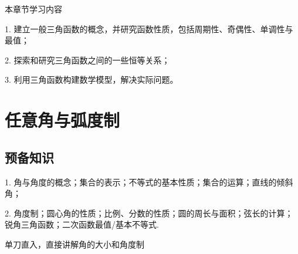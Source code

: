\makefront
\vspace{-1.5em}
\startexercise
\hspace{-2.5em}
{\hei 本章节学习内容}\par
1. 建立一般三角函数的概念，并研究函数性质，包括周期性、奇偶性、单调性与最值；\par
2. 探索和研究三角函数之间的一些恒等关系；\par
3. 利用三角函数构建数学模型，解决实际问题。\par

\section{任意角与弧度制}
\subsection{预备知识}
1. 角与角度的概念；集合的表示；不等式的基本性质；集合的运算；直线的倾斜角；\par
2. 角度制；圆心角的性质；比例、分数的性质；圆的周长与面积；弦长的计算；锐角三角函数；二次函数最值/基本不等式.\par
单刀直入，直接讲解角的大小和角度制
